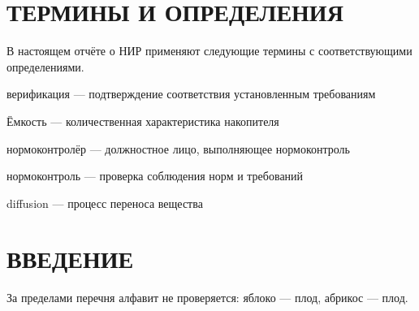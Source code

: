 \section*{ТЕРМИНЫ И ОПРЕДЕЛЕНИЯ}

В настоящем отчёте о НИР применяют следующие термины с соответствующими
определениями.

верификация — подтверждение соответствия установленным требованиям

Ёмкость — количественная характеристика накопителя

нормоконтролёр — должностное лицо, выполняющее нормоконтроль

нормоконтроль — проверка соблюдения норм и требований

diffusion — процесс переноса вещества

\section*{ВВЕДЕНИЕ}

За пределами перечня алфавит не проверяется: яблоко — плод, абрикос — плод.
